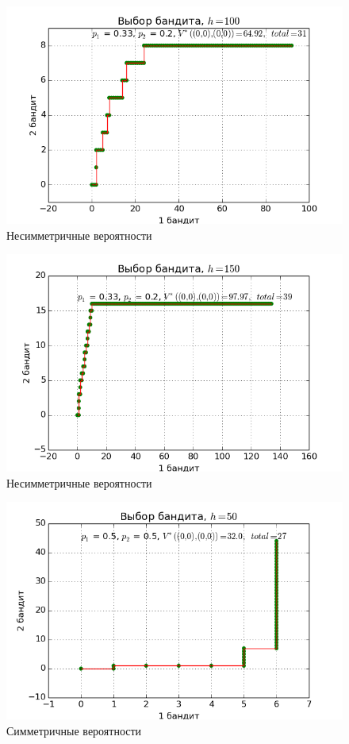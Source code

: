 \documentclass[12pt]{article}
\begin{document}
\begin{figure}
  \begin{center}
  	\caption{Несимметричные вероятности}
    \includegraphics{2bandits-pic5.png}
  \end{center}
\end{figure}
\begin{figure}
  \begin{center}
  	\caption{Несимметричные вероятности}
    \includegraphics{2bandits-pic6.png}
  \end{center}
\end{figure}
\begin{figure}
  \begin{center}
  	\caption{Симметричные вероятности}
    \includegraphics{2bandits-pic7.png}
  \end{center}
\end{figure}
\end{document}
